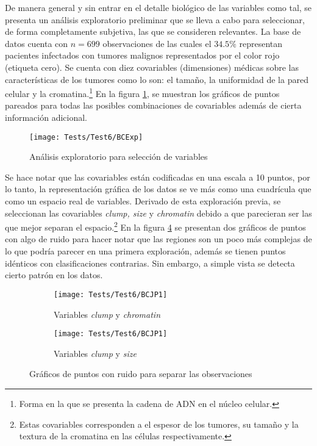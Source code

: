 \documentclass[../Main/Main.tex]{subfiles}
\begin{document}
De manera general y sin entrar en el detalle biológico de las variables como tal, se presenta un análisis exploratorio preliminar que se lleva a cabo para seleccionar, de forma completamente subjetiva, las que se consideren relevantes.  La base de datos cuenta con $n = 699$ observaciones de las cuales el $34.5\%$ representan pacientes infectados con tumores malignos representados por el color rojo (etiqueta cero). Se cuenta con diez covariables (dimensiones) médicas sobre las características de los tumores como lo son: el tamaño, la uniformidad de la pared celular y la cromatina.\footnote{Forma en la que se presenta la cadena de ADN en el núcleo celular.} En la figura \ref{fig:BCExp}, se muestran los gráficos de puntos pareados para todas las posibles combinaciones de covariables además de cierta información adicional.
\begin{figure}[h]
	\centering
	\texttt{[image: Tests/Test6/BCExp]}
	\caption{Análisis exploratorio para selección de variables}
	\label{fig:BCExp}
\end{figure}
Se hace notar que las covariables están codificadas en una escala a 10 puntos, por lo tanto, la representación gráfica de los datos se ve más como una cuadrícula que como un espacio real de variables. Derivado de esta exploración previa, se seleccionan las covariables \textit{clump, size} y \textit{chromatin} debido a que parecieran ser las que mejor separan el espacio.\footnote{Estas covariables corresponden a el espesor de los tumores, su tamaño y la textura de la cromatina en las células respectivamente.} En la figura \ref{fig:BCJP} se presentan dos gráficos de puntos con algo de ruido para hacer notar que las regiones son un poco más complejas de lo que podría parecer en una primera exploración, además se tienen puntos idénticos con clasificaciones contrarias. Sin embargo, a simple vista se detecta cierto patrón en los datos.
\begin{figure}[h]
        \centering
        \begin{subfigure}[b]{0.45\textwidth}
            \centering
            \texttt{[image: Tests/Test6/BCJP1]}
            \caption{Variables \textit{clump} y \textit{chromatin}}
			\label{fig:BCJP1}
        \end{subfigure}
        \hfill
        \begin{subfigure}[b]{0.45\textwidth}  
            \centering 
            \texttt{[image: Tests/Test6/BCJP1]}
            \caption{Variables \textit{clump} y \textit{size}}
			\label{fig:BCJP2}
        \end{subfigure}
		\caption{Gráficos de puntos con ruido para separar las observaciones}
		\label{fig:BCJP}
\end{figure}
\end{document}

